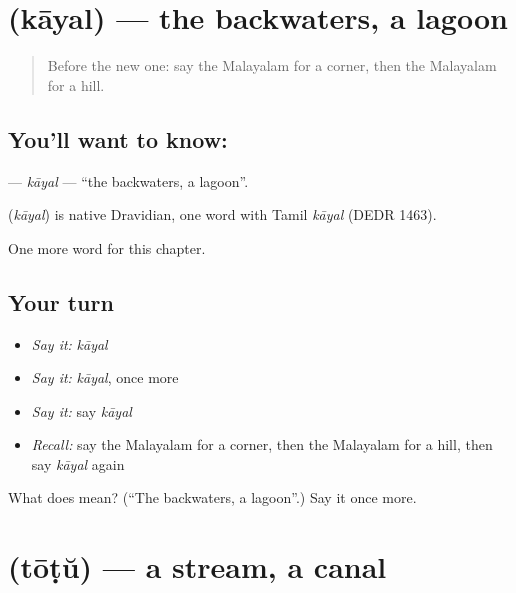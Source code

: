 \section[\texorpdfstring{\ml{കായൽ} (kāyal)}{കായൽ (kāyal)}]{ (kāyal) — the backwaters, a lagoon}

\label{lesson:ML-C239-kayal}



\begin{quote}
Before the new one: say the Malayalam for a corner, then the Malayalam for a hill.
\end{quote}

\subsection*{You'll want to know: }
\textbf{} — \emph{kāyal} — \textquotedblleft{}the backwaters, a lagoon\textquotedblright{}.

\begin{cousinweb}
\textbf{} (\emph{kāyal}) is native Dravidian, one word with Tamil \emph{kāyal} (DEDR 1463).
\end{cousinweb}

\begin{grammarlens}[title={What you've built}]
One more word for this chapter.
\end{grammarlens}

\subsection*{Your turn}
\begin{itemize}
\raggedright
  \item \emph{Say it:} \emph{kāyal}
  \item \emph{Say it:} \emph{kāyal}, once more
  \item \emph{Say it:} say \emph{kāyal}
  \item \emph{Recall:} say the Malayalam for a corner, then the Malayalam for a hill, then say \emph{kāyal} again
\end{itemize}

\begin{tcolorbox}[breakable,colback=teal!4,colframe=teal!35!black,title={Before you move on}]
What does  mean? (\textquotedblleft{}The backwaters, a lagoon\textquotedblright{}.) Say it once more.
\end{tcolorbox}
\section[\texorpdfstring{\ml{തോട്} (tōṭŭ)}{തോട് (tōṭŭ)}]{ (tōṭŭ) — a stream, a canal}

